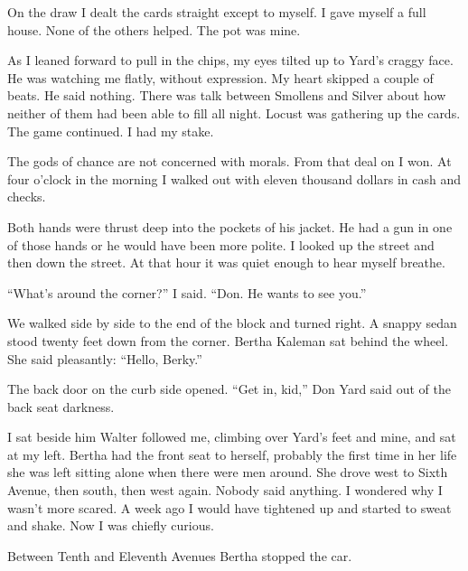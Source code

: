 \documentclass{novel}
\begin{document}
On the draw I dealt the cards straight except to myself. I gave myself a full house. None of the others helped. The pot was mine.

As I leaned forward to pull in the chips, my eyes tilted up to Yard’s craggy face. He was watching me flatly, without expression. My heart skipped a couple of beats. He said nothing. There was talk between Smollens and Silver about how neither of them had been able to fill all night. Locust was gathering up the cards. The game continued. I had my stake.

The gods of chance are not concerned with morals. From that deal on I won. At four o’clock in the morning I walked out with eleven thousand dollars in cash and checks.

\vspace{2\nbs}
\clearpage
\thispagestyle{empty}


\begin{ChapterStart}
\vspace{3\nbs}
\end{ChapterStart}

Both hands were thrust deep into the pockets of his jacket. He had a gun in one of those hands or he would have been more polite. I looked up the street and then down the street. At that hour it was quiet enough to hear myself breathe.

“What’s around the corner?” I said. “Don. He wants to see you.”

We walked side by side to the end of the block and turned right. A snappy sedan stood twenty feet down from the corner. Bertha Kaleman sat behind the wheel. She said pleasantly: “Hello, Berky.”

The back door on the curb side opened. “Get in, kid,” Don Yard said out of the back seat darkness.

I sat beside him Walter followed me, climbing over Yard’s feet and mine, and sat at my left. Bertha had the front seat to herself, probably the first time in her life she was left sitting alone when there were men around. She drove west to Sixth Avenue, then south, then west again. Nobody said anything. I wondered why I wasn’t more scared. A week ago I would have tightened up and started to sweat and shake. Now I was chiefly curious.

Between Tenth and Eleventh Avenues Bertha stopped the car.
\end{document}
